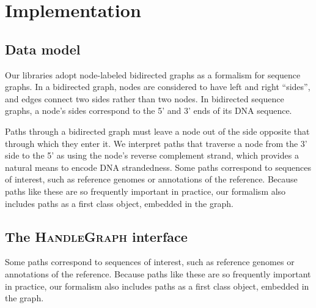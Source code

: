 \documentclass{article}
\begin{document}



\section{Implementation}

\subsection{Data model}

Our libraries adopt node-labeled bidirected graphs as a formalism for sequence graphs.
In a bidirected graph, nodes are considered to have left and right ``sides'', and edges connect two sides rather than two nodes.
In bidirected sequence graphs, a node's sides correspond to the 5' and 3' ends of its DNA sequence. 

Paths through a bidirected graph must leave a node out of the side opposite that through which they enter it.
We interpret paths that traverse a node from the 3' side to the 5' as using the node's reverse complement strand, which provides a natural means to encode DNA strandedness.
Some paths correspond to sequences of interest, such as reference genomes or annotations of the reference.
Because paths like these are so frequently important in practice, our formalism also includes paths as a first class object, embedded in the graph.

\subsection{The \textsc{HandleGraph} interface}

Some paths correspond to sequences of interest, such as reference genomes or annotations of the reference.
Because paths like these are so frequently important in practice, our formalism also includes paths as a first class object, embedded in the graph.
\end{document}
